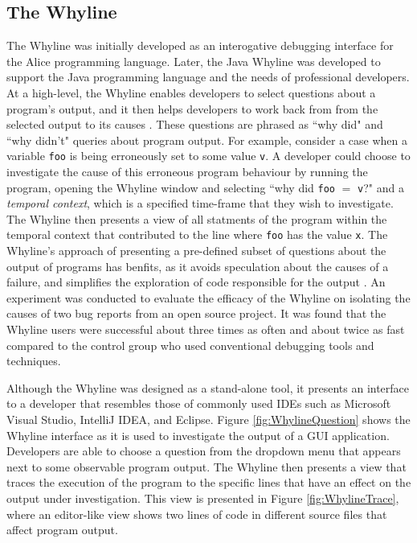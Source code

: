 \subsection{The Whyline}
\label{subsec:TheWhyline}

\par The Whyline was initially developed as an interogative debugging interface
for the Alice programming language. Later, the Java Whyline was developed to 
support the Java programming language and the needs of professional developers.
At a high-level, the Whyline enables developers to select questions about a
program's output, and it then helps developers to work back from from the 
selected output to its causes \cite{ko-2009-java-whyline}.
These questions are phrased as ``why did" and ``why didn't"
queries about program output.
For example, consider a case when a variable \texttt{foo} is being erroneously 
set to some value \texttt{v}.
A developer could choose to investigate the cause of this erroneous program
behaviour by running the program, opening the Whyline window and selecting
``why did \texttt{foo} $=$ \texttt{v}?" and a \emph{temporal context}, which is
a specified time-frame that they wish to investigate.
The Whyline then presents a view of all statments of the program within the
temporal context that contributed to the line where \texttt{foo} has the value
\texttt{x}. 
The Whyline's approach of presenting a pre-defined subset of questions about the 
output of programs has benfits, as it avoids speculation about the causes of
a failure, and simplifies the exploration of code responsible for the output
\cite{ko-2009-java-whyline}.
An experiment was conducted to evaluate the efficacy of the Whyline on 
isolating the causes of two bug reports from an open source project.
It was found that the Whyline users were successful about three times as often
and about twice as fast compared to the control group who used conventional
debugging tools and techniques.

\par Although the Whyline was designed as a stand-alone tool, it presents an 
interface to a developer that resembles those of commonly used \acp{IDE} such
as Microsoft Visual Studio, IntelliJ IDEA, and Eclipse.
Figure \ref{fig:WhylineQuestion} shows the Whyline interface as it is used
to investigate the output of a \ac{GUI} application.
Developers are able to choose a question from the dropdown menu that appears
next to some observable program output.
The Whyline then presents a view that traces the execution of the program
to the specific lines that have an effect on the output under investigation.
This view is presented in Figure \ref{fig:WhylineTrace},
where an editor-like view shows two lines of code in different source files
that affect program output.

